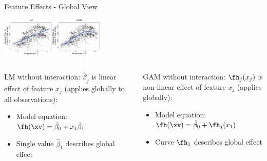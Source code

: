 \documentclass[11pt,compress,t,notes=noshow, aspectratio=169, xcolor=table]{beamer}
\begin{document}



\begin{frame}{Feature Effects - Global View}

\centering

\includegraphics[width=0.375\textwidth, trim=0cm 0.1cm 10.4cm 0cm, clip]{figure/lm_main_effects}

\begin{columns}[T, totalwidth=\linewidth]
\begin{column}{0.49\linewidth}
LM without interaction: $\hat\beta_j$ is linear effect of feature $x_j$ (applies globally to all observations):
\begin{itemize}
    \item Model equation: $\fh(\xv) = \hat\beta_0 + x_1\hat\beta_1$
    \item Single value $\hat\beta_1$ describes global effect
\end{itemize}
\end{column}\pause
\begin{column}{0.49\linewidth}
GAM without interaction: $\fh_j(x_j)$ is non-linear effect of feature $x_j$  (applies globally):
\begin{itemize}
    \item Model equation: $\fh(\xv) = \hat\beta_0 + \fh_j(x_1)$
    \item Curve $\fh_1$ describes global effect
\end{itemize}
\end{column}
\end{columns}

\end{frame}
\end{document}
